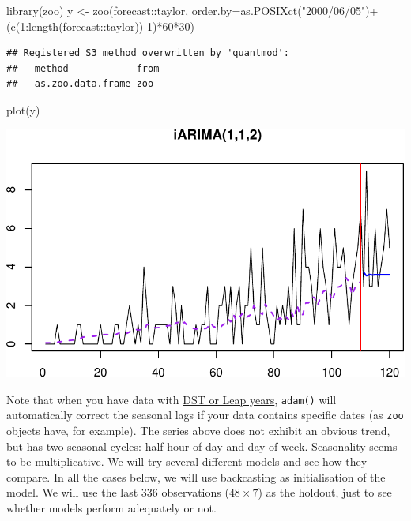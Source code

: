\documentclass[
]{book}
\newenvironment{Shaded}{\begin{snugshade}}{\end{snugshade}}
\newcommand{\AttributeTok}[1]{\textcolor[rgb]{0.77,0.63,0.00}{#1}}
\newcommand{\DecValTok}[1]{\textcolor[rgb]{0.00,0.00,0.81}{#1}}
\newcommand{\FunctionTok}[1]{\textcolor[rgb]{0.00,0.00,0.00}{#1}}
\newcommand{\NormalTok}[1]{#1}
\newcommand{\OtherTok}[1]{\textcolor[rgb]{0.56,0.35,0.01}{#1}}
\newcommand{\SpecialCharTok}[1]{\textcolor[rgb]{0.00,0.00,0.00}{#1}}
\newcommand{\StringTok}[1]{\textcolor[rgb]{0.31,0.60,0.02}{#1}}
\theoremstyle{definition}
\theoremstyle{definition}
\theoremstyle{definition}
\theoremstyle{definition}
\theoremstyle{remark}
\begin{document}
\begin{Shaded}
\begin{Highlighting}[]
\FunctionTok{library}\NormalTok{(zoo)}
\NormalTok{y }\OtherTok{\textless{}{-}} \FunctionTok{zoo}\NormalTok{(forecast}\SpecialCharTok{::}\NormalTok{taylor,}
         \AttributeTok{order.by=}\FunctionTok{as.POSIXct}\NormalTok{(}\StringTok{"2000/06/05"}\NormalTok{)}\SpecialCharTok{+}
\NormalTok{           (}\FunctionTok{c}\NormalTok{(}\DecValTok{1}\SpecialCharTok{:}\FunctionTok{length}\NormalTok{(forecast}\SpecialCharTok{::}\NormalTok{taylor))}\SpecialCharTok{{-}}\DecValTok{1}\NormalTok{)}\SpecialCharTok{*}\DecValTok{60}\SpecialCharTok{*}\DecValTok{30}\NormalTok{)}
\end{Highlighting}
\end{Shaded}

\begin{verbatim}
## Registered S3 method overwritten by 'quantmod':
##   method            from
##   as.zoo.data.frame zoo
\end{verbatim}

\begin{Shaded}
\begin{Highlighting}[]
\FunctionTok{plot}\NormalTok{(y)}
\end{Highlighting}
\end{Shaded}

\includegraphics{adam_files/figure-latex/unnamed-chunk-97-1.pdf}

Note that when you have data with \protect\hyperlink{MultipleFrequenciesDSTandLeap}{DST or Leap years}, \texttt{adam()} will automatically correct the seasonal lags if your data contains specific dates (as \texttt{zoo} objects have, for example). The series above does not exhibit an obvious trend, but has two seasonal cycles: half-hour of day and day of week. Seasonality seems to be multiplicative. We will try several different models and see how they compare. In all the cases below, we will use backcasting as initialisation of the model. We will use the last 336 observations (\(48 \times 7\)) as the holdout, just to see whether models perform adequately or not.
\end{document}
